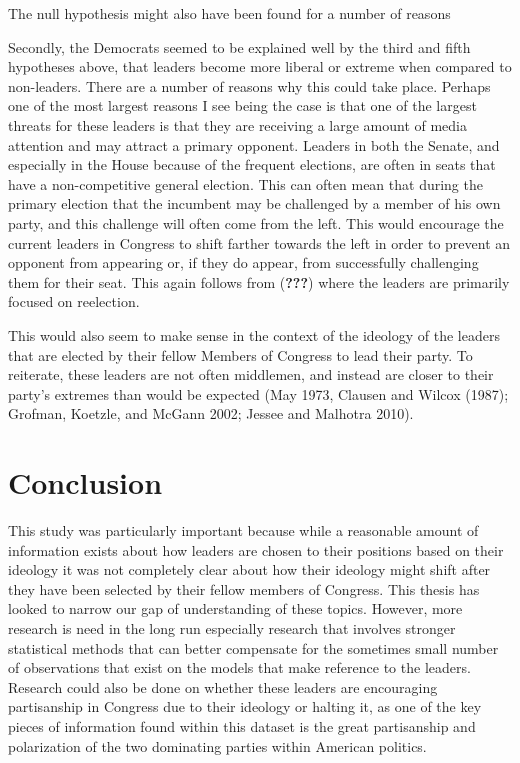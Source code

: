 \documentclass[12pt,twoside]{reedthesis}
\begin{document}
  The null hypothesis might also have been found for a number of reasons
  
  Secondly, the Democrats seemed to be explained well by the third and
  fifth hypotheses above, that leaders become more liberal or extreme when
  compared to non-leaders. There are a number of reasons why this could
  take place. Perhaps one of the most largest reasons I see being the case
  is that one of the largest threats for these leaders is that they are
  receiving a large amount of media attention and may attract a primary
  opponent. Leaders in both the Senate, and especially in the House
  because of the frequent elections, are often in seats that have a
  non-competitive general election. This can often mean that during the
  primary election that the incumbent may be challenged by a member of his
  own party, and this challenge will often come from the left. This would
  encourage the current leaders in Congress to shift farther towards the
  left in order to prevent an opponent from appearing or, if they do
  appear, from successfully challenging them for their seat. This again
  follows from ({\textbf{???}}) where the leaders are primarily focused on
  reelection.
  
  This would also seem to make sense in the context of the ideology of the
  leaders that are elected by their fellow Members of Congress to lead
  their party. To reiterate, these leaders are not often middlemen, and
  instead are closer to their party's extremes than would be expected (May
  1973, Clausen and Wilcox (1987); Grofman, Koetzle, and McGann 2002;
  Jessee and Malhotra 2010).
  
  \section{Conclusion}\label{conclusion-1}
  
  This study was particularly important because while a reasonable amount
  of information exists about how leaders are chosen to their positions
  based on their ideology it was not completely clear about how their
  ideology might shift after they have been selected by their fellow
  members of Congress. This thesis has looked to narrow our gap of
  understanding of these topics. However, more research is need in the
  long run especially research that involves stronger statistical methods
  that can better compensate for the sometimes small number of
  observations that exist on the models that make reference to the
  leaders. Research could also be done on whether these leaders are
  encouraging partisanship in Congress due to their ideology or halting
  it, as one of the key pieces of information found within this dataset is
  the great partisanship and polarization of the two dominating parties
  within American politics.
  
\end{document}
